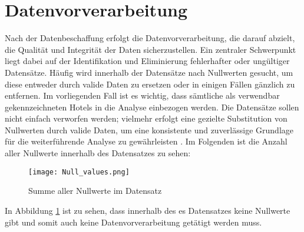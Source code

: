 \section{Datenvorverarbeitung}
\label{subsec:Datenvorverarbeitung}
Nach der Datenbeschaffung erfolgt die Datenvorverarbeitung, die darauf abzielt, die Qualität und Integrität der Daten sicherzustellen. Ein zentraler Schwerpunkt liegt dabei auf der Identifikation und Eliminierung fehlerhafter oder ungültiger Datensätze. Häufig wird innerhalb der Datensätze nach Nullwerten gesucht, um diese entweder durch valide Daten zu ersetzen oder in einigen Fällen gänzlich zu entfernen. Im vorliegenden Fall ist es wichtig, dass sämtliche als verwendbar gekennzeichneten Hotels in die Analyse einbezogen werden. Die Datensätze sollen nicht einfach verworfen werden; vielmehr erfolgt eine gezielte Substitution von Nullwerten durch valide Daten, um eine konsistente und zuverlässige Grundlage für die weiterführende Analyse zu gewährleisten \cite{Agarwal.05.10.2018}.
\newline
\newline
Im Folgenden ist die Anzahl aller Nullwerte innerhalb des Datensatzes zu sehen:
\begin{figure}[h]
    \centering
    \texttt{[image: Null\_values.png]}
    \caption[Summe aller Nullwerte im Datensatz]{Summe aller Nullwerte im Datensatz}
    \label{img:null_values}
\end{figure}

In Abbildung \ref{img:null_values} ist zu sehen, dass innerhalb des es Datensatzes keine Nullwerte gibt und somit auch keine Datenvorverarbeitung getätigt werden muss.